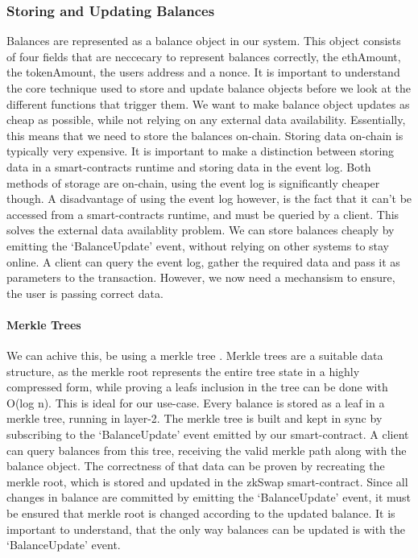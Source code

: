\documentclass[../../thesis.tex]{subfiles}
\begin{document}
\subsubsection{Storing and Updating Balances} \label{balances}
Balances are represented as a balance object in our system. This object consists of four fields that are neccecary to represent balances correctly, the ethAmount, the tokenAmount, the users address and a nonce. It is important to understand the core technique used to store and update balance objects before we look at the different functions that trigger them. We want to make balance object updates as cheap as possible, while not relying on any external data availability. Essentially, this means that we need to store the balances on-chain. Storing data on-chain is typically very expensive. It is important to make a distinction between storing data in a smart-contracts runtime and storing data in the event log. Both methods of storage are on-chain, using the event log is significantly cheaper though. A disadvantage of using the event log however, is the fact that it can't be accessed from a smart-contracts runtime, and must be queried by a client. This solves the external data availablity problem. We can store balances cheaply by emitting the `BalanceUpdate' event, without relying on other systems to stay online. A client can query the event log, gather the required data and pass it as parameters to the transaction. However, we now need a mechansism to ensure, the user is passing correct data. 

\paragraph{Merkle Trees}
We can achive this, be using a merkle tree \cite{szydlo2004merkle}. Merkle trees are a suitable data structure, as the merkle root represents the entire tree state in a highly compressed form, while proving a leafs inclusion in the tree can be done with O(log n). This is ideal for our use-case. Every balance is stored as a leaf in a merkle tree, running in layer-2. The merkle tree is built and kept in sync by subscribing to the ‘BalanceUpdate’ event emitted by our smart-contract. A client can query balances from this  tree, receiving the valid merkle path along with the balance object. The correctness of that data can be proven by recreating the merkle root, which is stored and updated in the zkSwap smart-contract. Since all changes in balance are committed by emitting the `BalanceUpdate' event, it must be ensured that merkle root is changed according to the updated balance. It is important to understand, that the only way balances can be updated is with the `BalanceUpdate' event.
\end{document}
